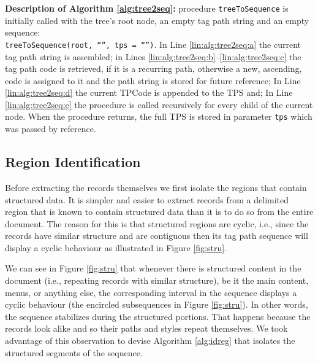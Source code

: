 \documentclass{vldb}
\begin{document}
\textbf{Description of Algorithm \ref{alg:tree2seq}:} procedure
\texttt{treeToSequence} is initially called with the tree's root node, an empty
tag path string and an empty sequence: \\\texttt{treeToSequence}\texttt{(root,
``'', tps = ``'')}. In Line \ref{lin:alg:tree2seq:a} the current tag path string is
assembled; in Lines \ref{lin:alg:tree2seq:b}--\ref{lin:alg:tree2seq:c} the tag
path code is retrieved, if it is a recurring path, otherwise a new, ascending,
code is assigned to it and the path string is stored for future reference; In
Line \ref{lin:alg:tree2seq:d} the current TPCode is appended to the TPS and; In
Line \ref{lin:alg:tree2seq:e} the procedure is called recursively for every
child of the current node. When the procedure returns, the full TPS is stored in
parameter \texttt{tps} which was passed by reference.

\subsection{Region Identification}\label{ss:regi}

Before extracting the records themselves we first isolate the regions that
contain structured data. It is simpler and easier to extract records from a
delimited region that is known to contain structured data than it is to do so
from the entire document. The reason for this is that structured regions are
cyclic, i.e., since the records have similar structure and are contiguous then
its tag path sequence will display a cyclic behaviour as illustrated in Figure
\ref{fig:stru}.

We can see in Figure \ref{fig:stru} that whenever there is structured
content in the document (i.e., repeating records with similar structure), be it
the main content, menus, or anything else, the corresponding interval in the
sequence displays a cyclic behaviour (the encircled subsequences in Figure
\ref{fig:stru}).
In other words, the sequence stabilizes during the structured portions. That
happens because the records look alike and so their paths and styles repeat
themselves. We took advantage of this observation to devise Algorithm
\ref{alg:idreg} that isolates the structured segments of the sequence.
\end{document}
